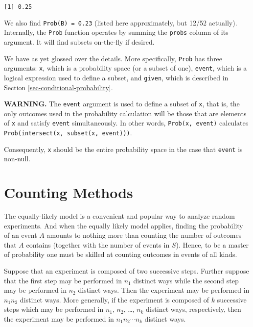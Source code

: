 \documentclass[]{book}
\numberwithin{equation}{chapter}
\numberwithin{figure}{chapter}
\theoremstyle{plain}
\theoremstyle{definition}
\theoremstyle{remark}
\theoremstyle{definition}
\theoremstyle{definition}
\theoremstyle{remark}
\let\BeginKnitrBlock\begin \let\EndKnitrBlock\end
\begin{document}
\begin{verbatim}
[1] 0.25
\end{verbatim}

We also find \texttt{Prob(B)\ =\ 0.23} (listed here approximately, but
12/52 actually). Internally, the \texttt{Prob} function operates by
summing the \texttt{probs} column of its argument. It will find subsets
on-the-fly if desired.

We have as yet glossed over the details. More specifically,
\texttt{Prob} has three arguments: \texttt{x}, which is a probability
space (or a subset of one), \texttt{event}, which is a logical
expression used to define a subset, and \texttt{given}, which is
described in Section \ref{sec-conditional-probability}.

\textbf{WARNING.} The \texttt{event} argument is used to define a subset
of \texttt{x}, that is, the only outcomes used in the probability
calculation will be those that are elements of \texttt{x} and satisfy
\texttt{event} simultaneously. In other words, \texttt{Prob(x,\ event)}
calculates \texttt{Prob(intersect(x,\ subset(x,\ event)))}.

Consequently, \texttt{x} should be the entire probability space in the
case that \texttt{event} is non-null.

\section{Counting Methods}\label{sec-methods-of-counting}

The equally-likely model is a convenient and popular way to analyze
random experiments. And when the equally likely model applies, finding
the probability of an event \(A\) amounts to nothing more than counting
the number of outcomes that \(A\) contains (together with the number of
events in \(S\)). Hence, to be a master of probability one must be
skilled at counting outcomes in events of all kinds.

\bigskip

\BeginKnitrBlock{proposition}[The Multiplication Principle]
\protect\hypertarget{prp:unnamed-chunk-131}{}{\label{prp:unnamed-chunk-131}
\iffalse (The Multiplication Principle) \fi }Suppose that an experiment
is composed of two successive steps. Further suppose that the first step
may be performed in \(n_{1}\) distinct ways while the second step may be
performed in \(n_{2}\) distinct ways. Then the experiment may be
performed in \(n_{1}n_{2}\) distinct ways. More generally, if the
experiment is composed of \(k\) successive steps which may be performed
in \(n_{1}\), \(n_{2}\), \ldots{}, \(n_{k}\) distinct ways,
respectively, then the experiment may be performed in
\(n_{1} n_{2} \cdots n_{k}\) distinct ways.
\EndKnitrBlock{proposition}
\end{document}
